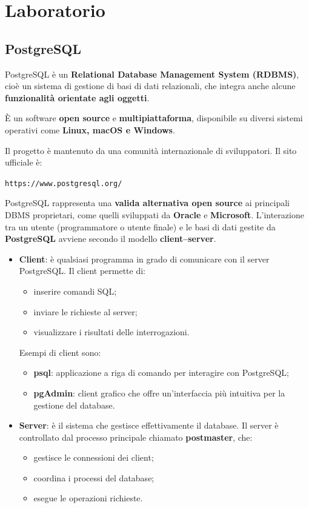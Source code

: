 \section{Laboratorio}
\subsection{PostgreSQL}

PostgreSQL è un \textbf{Relational Database Management System (RDBMS)}, cioè un sistema di gestione di basi di dati relazionali, che integra anche alcune \textbf{funzionalità orientate agli oggetti}.

È un software \textbf{open source} e \textbf{multipiattaforma}, disponibile su diversi sistemi operativi come \textbf{Linux, macOS e Windows}.

Il progetto è mantenuto da una comunità internazionale di sviluppatori. Il sito ufficiale è:

\begin{center}
	\texttt{https://www.postgresql.org/}
\end{center}

PostgreSQL rappresenta una \textbf{valida alternativa open source} ai principali DBMS proprietari, come quelli sviluppati da \textbf{Oracle} e \textbf{Microsoft}.
L'interazione tra un utente (programmatore o utente finale) e le basi di dati gestite da \textbf{PostgreSQL} avviene secondo il modello \textbf{client--server}.

\begin{itemize}
	
	\item \textbf{Client}: è qualsiasi programma in grado di comunicare con il server PostgreSQL.  
	Il client permette di:
	\begin{itemize}
		\item inserire comandi SQL;
		\item inviare le richieste al server;
		\item visualizzare i risultati delle interrogazioni.
	\end{itemize}
	
	Esempi di client sono:
	\begin{itemize}
		\item \textbf{psql}: applicazione a riga di comando per interagire con PostgreSQL;
		\item \textbf{pgAdmin}: client grafico che offre un'interfaccia più intuitiva per la gestione del database.
	\end{itemize}
	
	\item \textbf{Server}: è il sistema che gestisce effettivamente il database.  
	Il server è controllato dal processo principale chiamato \textbf{postmaster}, che:
	\begin{itemize}
		\item gestisce le connessioni dei client;
		\item coordina i processi del database;
		\item esegue le operazioni richieste.
	\end{itemize}
	
\end{itemize}

